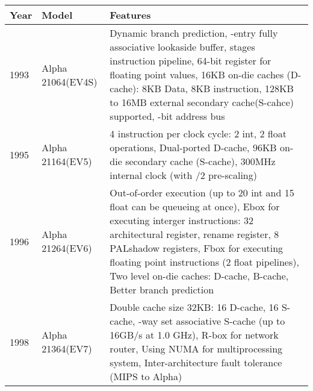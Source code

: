 \documentclass[letterpaper,10pt,titlepage]{article}
\begin{document}
\begin{center}
   \begin{longtable}{l l p{10cm}}
      \textbf{Year} & \textbf{Model}      & \textbf{Features}\\ \hline

      1993 & Alpha 21064\newline(EV4S)  & Dynamic branch prediction,
      					  \newline
      					  32-entry fully associative lookaside buffer,
					  \newline
					  5 stages instruction pipeline,
				          \newline
					  32 64-bit register for floating point values,
					  \newline
					  16KB on-die caches (D-cache): 8KB Data, 
					  8KB instruction,
					  \newline
					  128KB to 16MB external secondary cache(S-cahce) supported,
					  \newline
					  34-bit address bus\\

      \hline
      1995 & Alpha 21164\newline(EV5)   & 4 instruction per clock cycle: 2 int, 2 float operations,
      					  \newline
					  Dual-ported D-cache,
					  \newline
					  96KB on-die secondary cache (S-cache),
					  \newline
					  300MHz internal clock (with /2 pre-scaling)\\
      \hline
      1996 & Alpha 21264\newline(EV6)   & Out-of-order execution (up to 20 int and 15 float can be
      					  queueing at once), 
					  \newline
					  Ebox for executing interger instructions: 32 architectural register,
					  \newline
					  40 rename register, 8 PALshadow registers,
					  \newline
					  Fbox for executing floating point instructions (2 float pipelines),
					  \newline
					  Two level on-die caches: D-cache, B-cache,
					  \newline
					  Better branch prediction\\
      \hline
      1998& Alpha 21364\newline(EV7)   &  Double cache size 32KB: 16 D-cache, 16 S-cache,
      					  \newline
					  7-way set associative S-cache (up to 16GB/s at 1.0 GHz),
					  \newline
					  R-box for network router, Using NUMA for multiprocessing system,
					  \newline
					  Inter-architecture fault tolerance (MIPS to Alpha)\\
      \hline
   \end{longtable}
\end{center}
\end{document}
